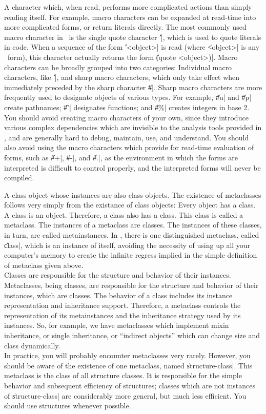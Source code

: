 \begin{description}
	{A character which, when read, performs more complicated
	actions than simply reading itself.  For example, macro
	characters can be expanded at read-time into more complicated
	forms, or return literals directly.  The most commonly used
	macro character in \Talk\ is the single quote character \|'|,
	which is used to quote literals in code.  When a sequence of
	the form \|'<object>| is read (where \|<object>| is any \Talk\
	form), this character actually returns the form \|(quote
	<object>)|.  Macro characters can be broadly grouped into two
	categories:  Individual macro characters, like \|'|, and sharp
	macro characters, which only take effect when immediately
	preceded by the sharp character \|\#|.  Sharp macro characters
	are more frequently used to designate objects of various
	types.  For example, \|\#u| and \|\#p| create pathnames; \|\#'|
	designates functions; and \|\#\%| creates integers in base 2.
   	You should avoid creating macro characters of your own, since
   	they introduce various complex dependencies which are
   	invisible to the analysis tools provided in \Talk, and are
   	generally hard to debug, maintain, use, and understand.  You
   	should also avoid using the macro characters which provide for
   	read-time evaluation of forms, such as \|\#+|, \|\#-|, and
   	\|\#.|, as the environment in which the forms are interpreted
   	is difficult to control properly, and the interpreted forms
   	will never be compiled.}

	{A class object whose instances are also class objects.  The
	existence of metaclasses follows very simply from the
	existance of class objects:  Every object has a class.  A
	class is an object.  Therefore, a class also has a class.
	This class is called a metaclass.  The instances of a
	metaclass are classes. The instances of these classes, in
	turn, are called metainstances.  In \Talk, there is one
	distinguished metaclass, called \|class|, which is an instance
	of itself, avoiding the necessity of using up all your
	computer's memory to create the infinite regress implied in
	the simple definition of metaclass given above.  \\
	Classes are responsible for the structure and behavior of
	their instances.  Metaclasses, being classes, are responsible
	for the structure and behavior of their instances, which are
	classes.  The behavior of a class includes its instance
	representation and inheritance support.  Therefore, a
	metaclass controls the representation of its metainstances and
	the inheritance strategy used by its instances.  So, for
	example, we have metaclasses which implement mixin
	inheritance, or single inheritance, or ``indirect objects''
	which can change size and class dynamically. \\
	In practice, you will probably encounter metaclasses very
	rarely.  However, you should be aware of the existence of one
	metaclass, named \|structure-class|.  This metaclass is the
	class of all structure classes.  It is responsible for the
	simple behavior and subsequent efficiency of structures;
	classes which are not instances of \|structure-class| are
	considerably more general, but much less efficient.  You
	should use structures whenever possible.}


\end{description}
